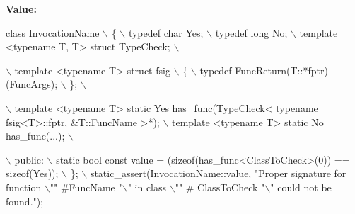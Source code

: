 {\bfseries Value\+:}
\begin{DoxyCode}
\textcolor{keyword}{class }InvocationName                                                                                    \(\backslash\)
    \{                                                                                                       
      \(\backslash\)
        typedef \textcolor{keywordtype}{char} Yes;                                                                                   
      \(\backslash\)
        typedef \textcolor{keywordtype}{long} No;                                                                                    
      \(\backslash\)
        template <typename T, T> \textcolor{keyword}{struct }TypeCheck;                                                          
      \(\backslash\)
                                                                                                            
      \(\backslash\)
        template <typename T> \textcolor{keyword}{struct }fsig                                                                   
      \(\backslash\)
        \{                                                                                                   
      \(\backslash\)
            typedef FuncReturn(T::*fptr)(FuncArgs);                                                     \(\backslash\)
        \};                                                                                                  
      \(\backslash\)
                                                                                                            
      \(\backslash\)
        template <typename T> \textcolor{keyword}{static} Yes has\_func(TypeCheck< \textcolor{keyword}{typename} fsig<T>::fptr, &T::FuncName >*);  \(\backslash\)
        template <typename T> \textcolor{keyword}{static} No  has\_func(...);                                                     
      \(\backslash\)
                                                                                                            
      \(\backslash\)
    public:                                                                                                 
      \(\backslash\)
        static \textcolor{keywordtype}{bool} \textcolor{keyword}{const} value = (\textcolor{keyword}{sizeof}(has\_func<ClassToCheck>(0)) == \textcolor{keyword}{sizeof}(Yes));                       
      \(\backslash\)
    \};                                                                                                      
      \(\backslash\)
    static\_assert(InvocationName::value, \textcolor{stringliteral}{"Proper signature for function \(\backslash\)""} #FuncName \textcolor{stringliteral}{"\(\backslash\)" in class \(\backslash\)""} #
      ClassToCheck \textcolor{stringliteral}{"\(\backslash\)" could not be found."});
\end{DoxyCode}
